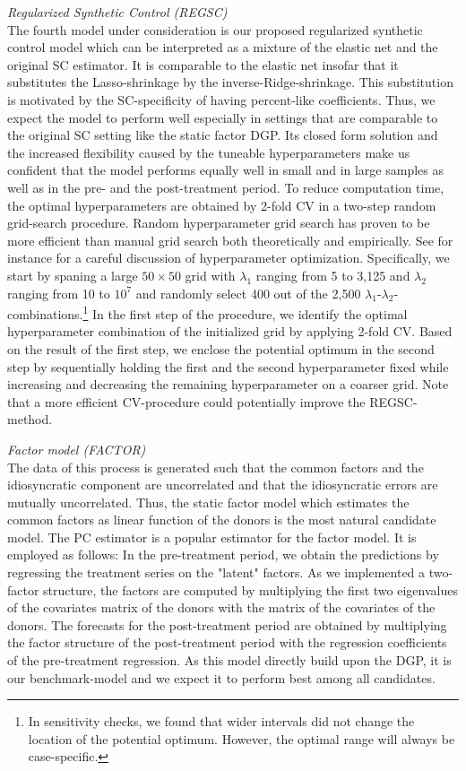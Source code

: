\textit{Regularized Synthetic Control (REGSC)}\\
The fourth model under consideration is our proposed regularized synthetic control model which can be interpreted as a mixture of the elastic net and the original \ac{SC} estimator. It is comparable to the elastic net insofar that it substitutes the Lasso-shrinkage by the inverse-Ridge-shrinkage. This substitution is motivated by the \ac{SC}-specificity of having percent-like coefficients. Thus, we expect the model to perform well especially in settings that are comparable to the original \ac{SC} setting like the static factor \ac{DGP}. Its closed form solution and the increased flexibility caused by the tuneable hyperparameters make us confident that the model performs equally well in small and in large samples as well as in the pre- and the post-treatment period. To reduce computation time, the optimal hyperparameters are obtained by 2-fold \ac{CV} in a two-step random grid-search procedure. Random hyperparameter grid search has proven to be more efficient than manual grid search both theoretically and empirically. See for instance \cite{bergstra:2012} for a careful discussion of hyperparameter optimization. Specifically, we start by spaning a large $50 \times 50$ grid with $\lambda_1$ ranging from 5 to 3,125 and $\lambda_2$ ranging from 10 to $10^7$ and randomly select 400 out of the 2,500 $\lambda_1$-$\lambda_2$-combinations.\footnote{In sensitivity checks, we found that wider intervals did not change the location of the potential optimum. However, the optimal range will always be case-specific.} In the first step of the procedure, we identify the optimal hyperparameter combination of the initialized grid by applying 2-fold \ac{CV}. Based on the result of the first step, we enclose the potential optimum in the second step by sequentially holding the first and the second hyperparameter fixed while increasing and decreasing the remaining hyperparameter on a coarser grid. Note that a more efficient \ac{CV}-procedure could potentially improve the \ac{REGSC}-method.

\textit{Factor model (FACTOR)}\\
The data of this process is generated such that the common factors and the idiosyncratic component are uncorrelated and that the idiosyncratic errors are mutually uncorrelated. Thus, the static factor model which estimates the common factors as linear function of the donors is the most natural candidate model. The \ac{PC} estimator is a popular estimator for the factor model. It is employed as follows: In the pre-treatment period, we obtain the predictions by regressing the treatment series on the "latent" factors. As we implemented a two-factor structure, the factors are computed by multiplying the first two eigenvalues of the covariates matrix of the donors with the matrix of the covariates of the donors. The forecasts for the post-treatment period are obtained by multiplying the factor structure of the post-treatment period with the regression coefficients of the pre-treatment regression. As this model directly build upon the \ac{DGP}, it is our benchmark-model and we expect it to perform best among all candidates.

